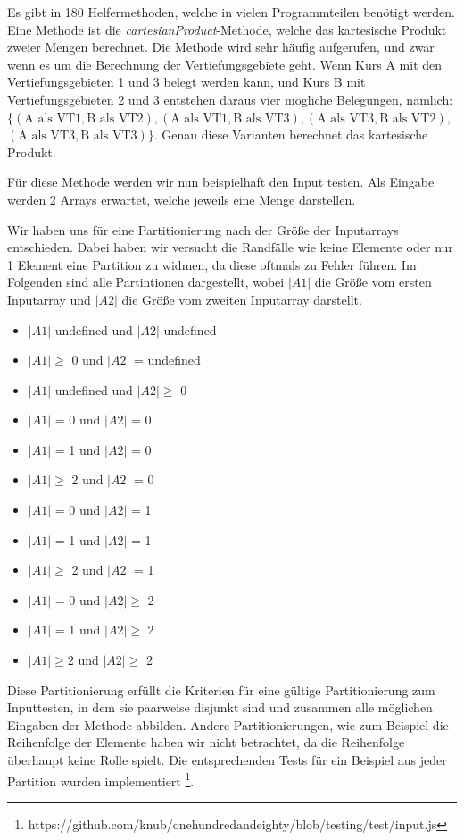 \documentclass[ngerman]{article}
\begin{document}
Es gibt in 180 Helfermethoden, welche in vielen Programmteilen benötigt werden. Eine Methode ist die \emph{cartesianProduct}-Methode, welche das kartesische Produkt zweier Mengen berechnet.
Die Methode wird sehr häufig aufgerufen, und zwar wenn es um die Berechnung der Vertiefungsgebiete geht.
Wenn Kurs A mit den Vertiefungsgebieten 1 und 3 belegt werden kann, und Kurs B mit Vertiefungsgebieten 2 und 3 entstehen daraus vier mögliche Belegungen, nämlich: \\
$\{ (\text{A als VT1}, \text{B als VT2}), (\text{A als VT1}, \text{B als VT3}), (\text{A als VT3}, \text{B als VT2}),$ \\ $(\text{A als VT3}, \text{B als VT3}) \}$.
Genau diese Varianten berechnet das kartesische Produkt.

Für diese Methode werden wir nun beispielhaft den Input testen.
Als Eingabe werden 2 Arrays erwartet, welche jeweils eine Menge darstellen.

Wir haben uns für eine Partitionierung nach der Größe der Inputarrays ent\-schie\-den.
Dabei haben wir versucht die Randfälle wie keine Elemente oder nur 1 Element eine Partition zu widmen, da diese oftmals zu Fehler führen.
Im Folgenden sind alle Partintionen dargestellt, wobei \emph{$|A1|$} die Größe vom ersten Inputarray und \emph{$|A2|$} die Größe vom zweiten Inputarray darstellt.
\begin{itemize}
\item $|A1|$ undefined und $|A2|$ undefined
\item $|A1| \geq$ 0 und $|A2|$ = undefined
\item $|A1|$ undefined und $|A2| \geq$ 0
\item $|A1|$ = 0 und $|A2|$ = 0
\item $|A1|$ = 1 und $|A2|$ = 0
\item $|A1| \geq$ 2 und $|A2|$ = 0
\item $|A1|$ = 0 und $|A2|$ = 1
\item $|A1|$ = 1 und $|A2|$ = 1
\item $|A1| \geq$ 2 und $|A2|$ = 1
\item $|A1|$ = 0 und $|A2| \geq$ 2
\item $|A1|$ = 1 und $|A2| \geq$  2
\item $|A1| \geq 2$ und $|A2| \geq $ 2
\end{itemize}

Diese Partitionierung erfüllt die Kriterien für eine gültige Partitionierung zum Inputtesten, in dem sie paarweise disjunkt sind und zusammen alle möglichen Eingaben der Methode abbilden.
Andere Partitionierungen, wie zum Beispiel die Reihenfolge der Elemente haben wir nicht betrachtet, da die Reihenfolge überhaupt keine Rolle spielt.
Die entsprechenden Tests für ein Beispiel aus jeder Partition wurden implementiert \footnote{https://github.com/knub/onehundredandeighty/blob/testing/test/input.js}.
\end{document}
